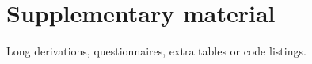\chapter{Supplementary material}
\label{app:supplementary}

Long derivations, questionnaires, extra tables or code listings.

